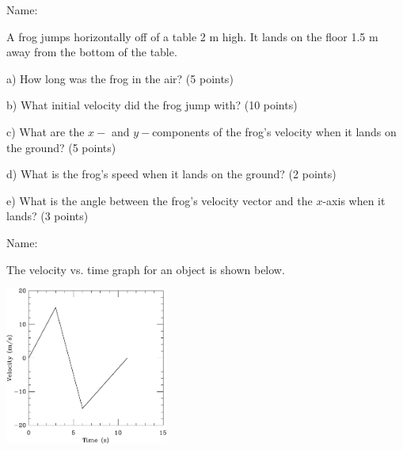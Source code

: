 \documentclass[12pt]{article}
\begin{document}
\begin{flushright}
Name: \underline{\hspace{3in}}
        \end{flushright}

        \Large \centerline{}
        \normalsize
        \rm

A frog jumps horizontally off of a table 2 m high. It lands on the floor 1.5 m away from the bottom of the table.

\it \bigskip

a) How long was the frog in the air? (5 points)

\vspace{1.2in}

b) What initial velocity did the frog jump with? (10 points)

\vspace{1.2in}

c) What are the $x-$ and $y-$components of the frog's velocity when it lands on the ground? (5 points)

\vspace{1.2in}

d) What is the frog's speed when it lands on the ground? (2 points)

\vspace{1in}

e) What is the angle between the frog's velocity vector and the $x$-axis when it lands? (3 points)

\bigskip

\newpage
\begin{flushright}
Name: \underline{\hspace{3in}}
        \end{flushright}

        \Large \centerline{}
        \normalsize
        \rm

The velocity vs. time graph for an object is shown below.

\centerline{\includegraphics[width=0.4\textwidth]{vel-crop.pdf}}
\it \bigskip
\end{document}
